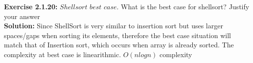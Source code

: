 \documentclass[11pt,fleqn]{article}
\begin{document}
\textbf{Exercise 2.1.20:} $Shellsort$ $best$ $case$. What is the best case for shellsort? Justify your answer\\

\textbf{Solution:}
Since ShellSort is very similar to insertion sort but uses larger spaces/gaps when sorting its elements, therefore the best case situation will match that of Insertion sort, which occurs when array is already sorted. The complexity at best case is linearithmic. $O(nlogn)$ complexity
\end{document}
